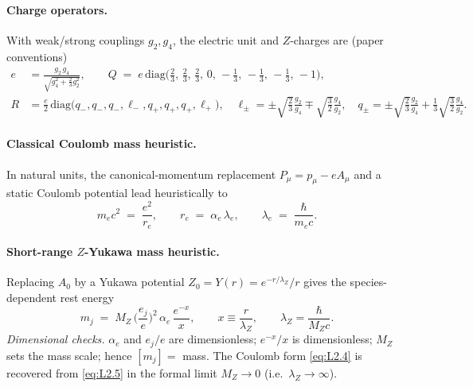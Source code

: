 \documentclass[11pt]{article}
\begin{document}
          \paragraph{Charge operators.}
              With weak/strong couplings $g_2, g_4$, the electric unit and $Z$-charges are (paper conventions)
              \begin{align}
              e &= \frac{g_2\,g_4}{\sqrt{g_4^2 + \tfrac{2}{3}g_2^2}},
              \qquad
              Q \;=\; e\,\mathrm{diag}\!\Big(\tfrac{2}{3},\,\tfrac{2}{3},\,\tfrac{2}{3},\,0,\,-\tfrac{1}{3},\,-\tfrac{1}{3},\,-\tfrac{1}{3},\,-1\Big),
              \label{eq:L2.2}\\[4pt]
              R &= \frac{e}{2}\,
              \mathrm{diag}\!\big(q_-,q_-,q_-,\ell_-,q_+,q_+,q_+,\ell_+\big),
              \quad
              \ell_\pm = \pm\sqrt{\tfrac{2}{3}}\frac{g_2}{g_4} \mp \sqrt{\tfrac{3}{2}}\frac{g_4}{g_2},
              \quad
              q_\pm = \pm\sqrt{\tfrac{2}{3}}\frac{g_2}{g_4} + \tfrac{1}{3}\sqrt{\tfrac{3}{2}}\frac{g_4}{g_2}.
              \label{eq:L2.3}
              \end{align}

          \paragraph{Classical Coulomb mass heuristic.}
              In natural units, the canonical-momentum replacement $P_\mu=p_\mu-eA_\mu$ and a static Coulomb potential lead heuristically to
              \begin{equation}
              m_e c^2 \;=\; \frac{e^2}{r_e},
              \qquad
              r_e \;=\; \alpha_e\,\lambda_e,
              \qquad
              \lambda_e \;=\; \frac{\hbar}{m_e c}.
              \label{eq:L2.4}
              \end{equation}

          \paragraph{Short-range $Z$-Yukawa mass heuristic.}
              Replacing $A_0$ by a Yukawa potential $Z_0=Y(r)=e^{-r/\lambda_Z}/r$ gives the species-dependent rest energy
              \begin{equation}
              m_j \;=\; M_Z\,
              \Big(\frac{e_j}{e}\Big)^{\!2}\,
              \alpha_e\,
              \frac{e^{-x}}{x},
              \qquad
              x\equiv \frac{r}{\lambda_Z},
              \qquad
              \lambda_Z=\frac{\hbar}{M_Z c}.
              \label{eq:L2.5}
              \end{equation}
              \textit{Dimensional checks.} $\alpha_e$ and $e_j/e$ are dimensionless; $e^{-x}/x$ is dimensionless; $M_Z$ sets the mass scale; hence $[m_j]=$ mass. The Coulomb form \eqref{eq:L2.4} is recovered from \eqref{eq:L2.5} in the formal limit $M_Z\!\to\!0$ (i.e.\ $\lambda_Z\!\to\!\infty$).
\end{document}

